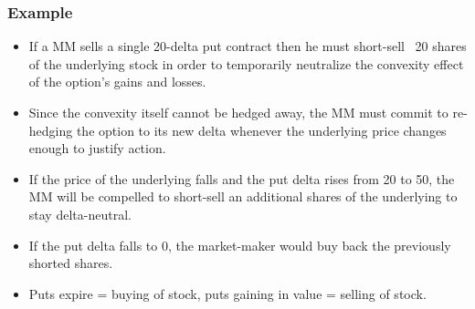 \documentclass[12pt, oneside]{article}
\begin{document}
\subsubsection{Example}
\begin{itemize}
    \item If a MM sells a single 20-delta put contract then he must short-sell ~20 shares of the underlying stock in order to temporarily neutralize the convexity effect of the option's gains and losses. 
    \item Since the convexity itself cannot be hedged away, the MM must commit to re-hedging the option to its new delta whenever the underlying price changes enough to justify action.
    \item If the price of the underlying falls and the put delta rises from 20 to 50, the MM will be compelled to short-sell an additional shares of the underlying to stay delta-neutral. 
    \item If the put delta falls to 0, the market-maker would buy back the previously shorted shares. 
    \item Puts expire = buying of stock, puts gaining in value = selling of stock.
\end{itemize}
\end{document}
